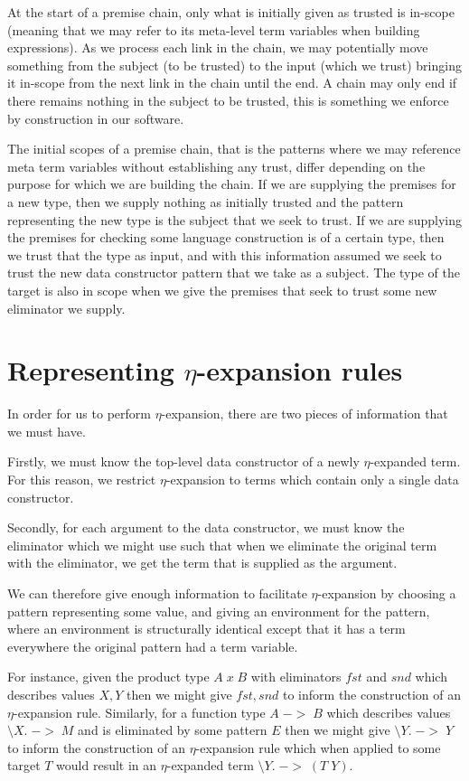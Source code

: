 At the start of a premise chain, only what is initially given as
trusted is in-scope (meaning that we may refer to its meta-level term
variables when building expressions). As we process each link in the
chain, we may potentially move something from the subject (to be
trusted) to the input (which we trust) bringing it in-scope from the
next link in the chain until the end. A chain may only end if there
remains nothing in the subject to be trusted, this is something we
enforce by construction in our software.

The initial scopes of a premise chain, that is the patterns where we
may reference meta term variables without establishing any trust,
differ depending on the purpose for which we are building the
chain. If we are supplying the premises for a new type, then we supply
nothing as initially trusted and the pattern representing the new type
is the subject that we seek to trust. If we are supplying the premises
for checking some language construction is of a certain type, then we
trust that the type as input, and with this information assumed we
seek to trust the new data constructor pattern that we take as a
subject. The type of the target is also in scope when we give the
premises that seek to trust some new eliminator we supply.

\section{Representing $\eta$-expansion rules}
\label{DSL-eta-rules}

In order for us to perform $\eta$-expansion, there are two pieces of
information that we must have.

Firstly, we must know the top-level data constructor of a newly
$\eta$-expanded term. For this reason, we restrict $\eta$-expansion to
terms which contain only a single data constructor.

Secondly, for each argument to the data constructor, we must know the
eliminator which we might use such that when we eliminate the original
term with the eliminator, we get the term that is supplied as the
argument.

We can therefore give enough information to facilitate
$\eta$-expansion by choosing a pattern representing some value, and
giving an environment for the pattern, where an environment is
structurally identical except that it has a term everywhere the
original pattern had a term variable.

For instance, given the product type $A \; x \; B$ with eliminators
$fst$ and $snd$ which describes values $X , Y$ then we might give $fst
, snd$ to inform the construction of an $\eta$-expansion rule. Similarly,
for a function type $A \; -> \; B$ which describes values $\setminus
X. \; -> \; M$ and is eliminated by some pattern $E$ then we might
give $\setminus Y. \; -> \; Y$ to inform the construction of an
$\eta$-expansion rule which when applied to some target $T$ would
result in an $\eta$-expanded term $\setminus Y. \; -> \; (T \; Y)$.

